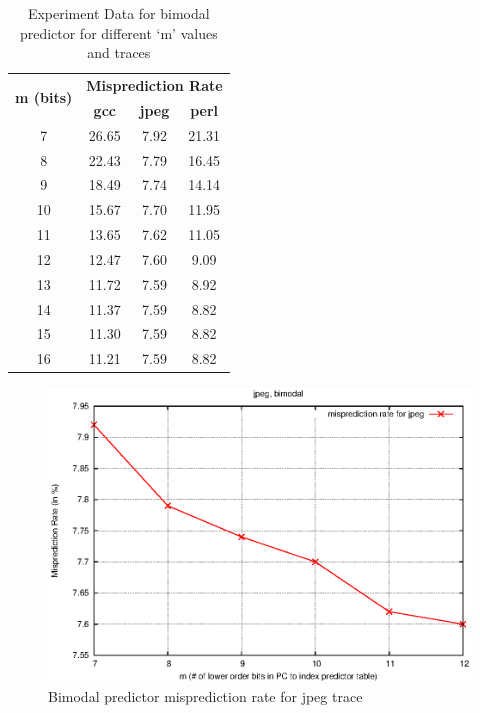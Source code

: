 \begin{table}[htbp]
    \centering
    \begin{tabular}{|c|c|c|c|}
        \hline
        \multirow{2}[3]{*}{\bf m (bits) } & \multicolumn{3}{c|}{\bf Misprediction Rate} \\
        \cline{2-4} & \bf gcc & \bf jpeg & \bf perl \\
        \hline
             7 & 26.65 & 7.92 & 21.31 \\
             8 & 22.43 & 7.79 & 16.45 \\
             9 & 18.49 & 7.74 & 14.14 \\
            10 & 15.67 & 7.70 & 11.95 \\
            11 & 13.65 & 7.62 & 11.05 \\
            12 & 12.47 & 7.60 &  9.09 \\
            13 & 11.72 & 7.59 &  8.92 \\
            14 & 11.37 & 7.59 &  8.82 \\
            15 & 11.30 & 7.59 &  8.82 \\
            16 & 11.21 & 7.59 &  8.82 \\
        \hline
    \end{tabular}
    \captionsetup{justification=centering}
    \caption{Experiment Data for bimodal predictor for different `m' values and traces}
    \label{tab:bimodal}
\end{table}

\begin{figure} [htbp]
    \centering
    \includegraphics[scale=1.32] {image/jpeg_bimodal.eps}
    \caption{Bimodal predictor misprediction rate for jpeg trace}
    \label{fig:bimodal_jpeg}
\end{figure}

